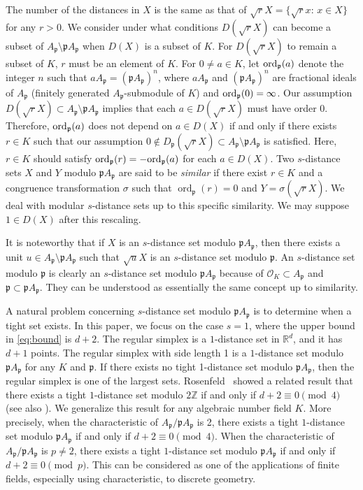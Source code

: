 \documentclass[a4paper, 11pt]{article}
\newcommand{\R}{\mathbb{R}}
\newcommand{\Z}{\mathbb{Z}}
\newcommand{\p}{\mathfrak{p}}
\theoremstyle{definition}
\begin{document}
The number of the distances in $X$ is the same as that of $\sqrt{r}X=\{\sqrt{r} x \colon\, x \in X\}$ for any $r>0$. 
We consider under what conditions \( D(\sqrt{r}X) \) can become a subset of \( A_\p \setminus \p A_\p \) when \( D(X) \) is a subset of \( K \).
For $D(\sqrt{r} X)$ to remain a subset of $K$, $r$ must be an element of $K$.
For $0\ne a \in K$, let ${\rm ord}_\mathfrak{p}(a)$ denote the integer $n$ such that $a A_\mathfrak{p}=(\mathfrak{p} A_\mathfrak{p})^n$, where $a A_\mathfrak{p}$ and $(\mathfrak{p} A_\mathfrak{p})^n$ are fractional ideals of $A_\mathfrak{p}$ (finitely generated  $A_\mathfrak{p}$-submodule of $K$) and ${\rm ord}_\mathfrak{p}(0)=\infty$.    
Our assumption $D(\sqrt{r}X)\subset A_\p \setminus \p A_\p$ implies that each $a \in D(\sqrt{r}X)$ must have order $0$. 
Therefore, 
${\rm ord}_\p(a)$ does not depend on $a \in D(X)$ if and only if  
there exists $r \in K$ such that our assumption $0 \not\in D_\p(\sqrt{r}X)\subset A_\p \setminus \p A_\p$ is satisfied. 
Here, $r\in K$ should satisfy ${\rm ord}_\p(r)=-{\rm ord}_\p(a)$ for each $a \in D(X)$. 
Two $s$-distance sets $X$ and $Y$ modulo $\mathfrak{p} A_{\mathfrak{p}}$ are said to be \textit{similar} if there exist $r \in K$ and a congruence transformation $\sigma$ such that  $\operatorname{ord}_{\mathfrak{p}}(r) = 0$ and $Y = \sigma(\sqrt{r} X)$.
We deal with modular $s$-distance sets up to this specific similarity.  
We may suppose $1 \in D(X)$ after this rescaling. 



It is noteworthy that if $X$ is an $s$-distance set modulo $\p A_\p$, then 
there exists a unit $u \in A_\p\setminus \p A_\p$ such that $\sqrt{u} X$ is an $s$-distance set modulo $\p$. 
An $s$-distance set modulo $\p$ is clearly an $s$-distance set modulo $\p A_\p$ because of $\mathcal{O}_K \subset A_\p$ and $\p \subset \p A_\p$. 
They can be understood as essentially the same concept up to similarity.



 
A natural problem concerning $s$-distance set modulo $\p A_\p$ is to determine when a tight set exists. In this paper, we focus on the case $s=1$, where the upper bound in \eqref{eq:bound} is $d+2$. 
The regular simplex is a $1$-distance set in $\R^d$, and it has $d+1$ points. The regular simplex with side length 1 is a $1$-distance set modulo $\p A_\p$ for any $K$ and $\p$. 
If there exists no tight 1-distance set modulo $\p A_\p$, then the regular simplex is one of the largest sets. 
Rosenfeld~\cite{R97} showed a related result that  there exists a tight $1$-distance set modulo $2 \Z$
if and only if $d+2 \equiv 0 \pmod{4}$ (see also \cite{Sp}). 
We generalize this result for any algebraic number field $K$. 
More precisely, when the characteristic of $A_\p/\p A_\p$ is 2, there exists a tight $1$-distance set modulo $\p A_\p$
if and only if $d+2 \equiv 0 \pmod{4}$. 
When the characteristic of $A_\p/\p A_\p$ is $p\ne 2$, there exists a tight $1$-distance set modulo $\p A_\p$
if and only if $d+2 \equiv 0 \pmod{p}$.  
This can be considered as one of the applications of finite fields, especially using characteristic, to discrete geometry.
\end{document}
